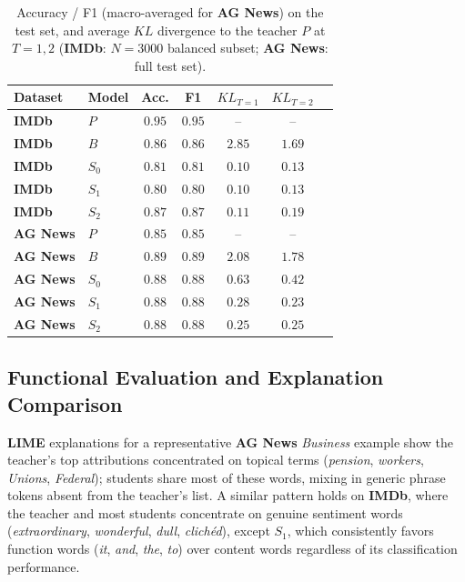 \documentclass[conference]{IEEEtran}
\begin{document}
\begin{table}[tb]
\centering
\caption{Accuracy / F1 (macro-averaged for \textbf{AG News}) on the test set, and average $KL$ divergence to the teacher $P$ at $T=1,2$ (\textbf{IMDb}: $N=3000$ balanced subset; \textbf{AG News}: full test set).}
\small
\begin{tabular}{|l|l|c|c|c|c|c|}
\hline
Dataset & Model & Acc. & F1 & $KL_{T=1}$ & $KL_{T=2}$ \\ \hline
\textbf{IMDb} & $P$ & $0.95$ & $0.95$ & -- & -- \\
\textbf{IMDb} & $B$ & $0.86$ & $0.86$ & $2.85$ & $1.69$ \\
\textbf{IMDb} & $S_0$ & $0.81$ & $0.81$ & $0.10$ & $0.13$ \\
\textbf{IMDb} & $S_1$ & $0.80$ & $0.80$ & $0.10$ & $0.13$ \\
\textbf{IMDb} & $S_2$ & $0.87$ & $0.87$ & $0.11$ & $0.19$ \\ \hline
\textbf{AG News} & $P$ & $0.85$ & $0.85$ & -- & -- \\
\textbf{AG News} & $B$ & $0.89$ & $0.89$ & $2.08$ & $1.78$ \\
\textbf{AG News} & $S_0$ & $0.88$ & $0.88$ & $0.63$ & $0.42$ \\
\textbf{AG News} & $S_1$ & $0.88$ & $0.88$ & $0.28$ & $0.23$ \\
\textbf{AG News} & $S_2$ & $0.88$ & $0.88$ & $0.25$ & $0.25$ \\ \hline
\end{tabular}
\label{tab:perf}
\end{table}

\subsection{Functional Evaluation and Explanation Comparison}\label{sec:functional-eval}

\textbf{LIME} explanations for a representative \textbf{AG News} \textit{Business} example show the teacher's top attributions concentrated on topical terms (\textit{pension}, \textit{workers}, \textit{Unions}, \textit{Federal}); students share most of these words, mixing in generic phrase tokens absent from the teacher's list. A similar pattern holds on \textbf{IMDb}, where the teacher and most students concentrate on genuine sentiment words (\textit{extraordinary}, \textit{wonderful}, \textit{dull}, \textit{clichéd}), except $S_1$, which consistently favors function words (\textit{it}, \textit{and}, \textit{the}, \textit{to}) over content words regardless of its classification performance.
\end{document}

